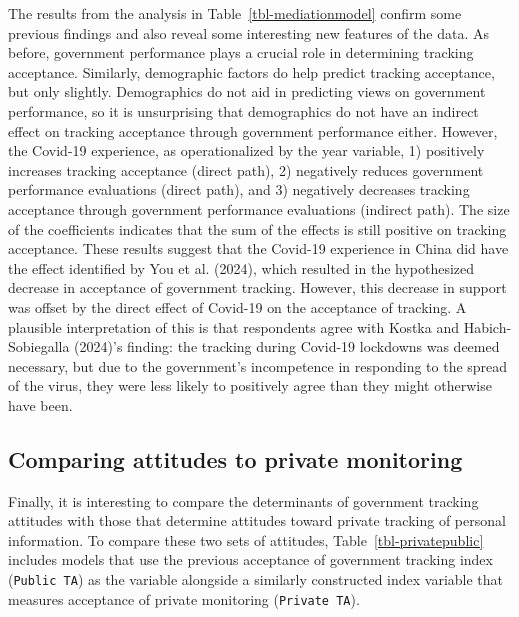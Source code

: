 \documentclass[
  letterpaper,
  DIV=11,
  numbers=noendperiod]{scrartcl}
\begin{document}
The results from the analysis in Table~\ref{tbl-mediationmodel} confirm
some previous findings and also reveal some interesting new features of
the data. As before, government performance plays a crucial role in
determining tracking acceptance. Similarly, demographic factors do help
predict tracking acceptance, but only slightly. Demographics do not aid
in predicting views on government performance, so it is unsurprising
that demographics do not have an indirect effect on tracking acceptance
through government performance either. However, the Covid-19 experience,
as operationalized by the year variable, 1) positively increases
tracking acceptance (direct path), 2) negatively reduces government
performance evaluations (direct path), and 3) negatively decreases
tracking acceptance through government performance evaluations (indirect
path). The size of the coefficients indicates that the sum of the
effects is still positive on tracking acceptance. These results suggest
that the Covid-19 experience in China did have the effect identified by
You et al. (2024), which resulted in the hypothesized decrease in
acceptance of government tracking. However, this decrease in support was
offset by the direct effect of Covid-19 on the acceptance of tracking. A
plausible interpretation of this is that respondents agree with Kostka
and Habich-Sobiegalla (2024)'s finding: the tracking during Covid-19
lockdowns was deemed necessary, but due to the government's incompetence
in responding to the spread of the virus, they were less likely to
positively agree than they might otherwise have been.

\subsection{Comparing attitudes to private
monitoring}\label{comparing-attitudes-to-private-monitoring}

Finally, it is interesting to compare the determinants of government
tracking attitudes with those that determine attitudes toward private
tracking of personal information. To compare these two sets of
attitudes, Table~\ref{tbl-privatepublic} includes models that use the
previous acceptance of government tracking index (\texttt{Public\ TA})
as the variable alongside a similarly constructed index variable that
measures acceptance of private monitoring (\texttt{Private\ TA}).
\end{document}
